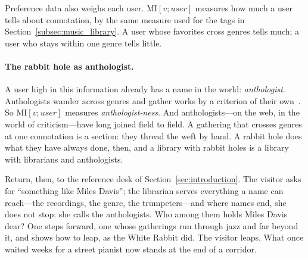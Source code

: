 Preference data also weighs each user. $\mathrm{MI}[v; \textit{user}]$
measures how much a user tells about connotation, by the same measure used
for the tags in Section~\ref{subsec:music_library}. A user whose favorites
cross genres tells much; a user who stays within one genre tells little.

\paragraph{The rabbit hole as anthologist.}
A user high in this information already has a name in the world:
\textit{anthologist}. Anthologists wander across genres and gather works by a
criterion of their own~\citep{Riva2017}. So $\mathrm{MI}[v; \textit{user}]$
measures \emph{anthologist-ness}. And anthologists---on the web, in the world of
criticism---have long joined field to field. A gathering that crosses genres at
one connotation is a section: they thread the weft by hand. A rabbit hole does
what they have always done, then, and a library with rabbit holes is a library
with librarians and anthologists.

Return, then, to the reference desk of
Section~\ref{sec:introduction}. The visitor asks for ``something
like Miles Davis''; the librarian serves everything a name can
reach---the recordings, the genre, the trumpeters---and where names
end, she does not stop: she calls the anthologists. Who among them
holds Miles Davis dear? One steps forward, one whose gatherings run
through jazz and far beyond it, and shows how to leap, as the White
Rabbit did. The visitor leaps. What once waited weeks for a street
pianist now stands at the end of a corridor.


